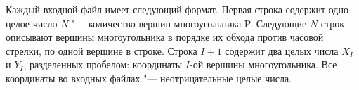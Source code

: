 Каждый входной файл имеет следующий формат. 
Первая строка содержит одно целое число $N$ "--- количество вершин многоугольника P.
Следующие $N$ строк описывают вершины многоугольника в порядке их обхода против часовой стрелки,
по одной вершине в строке. Строка $I+1$ содержит два целых числа $X_I$ и $Y_I$, разделенных пробелом: 
координаты $I$-ой вершины многоугольника. Все координаты во входных файлах "--- неотрицательные целые числа.


